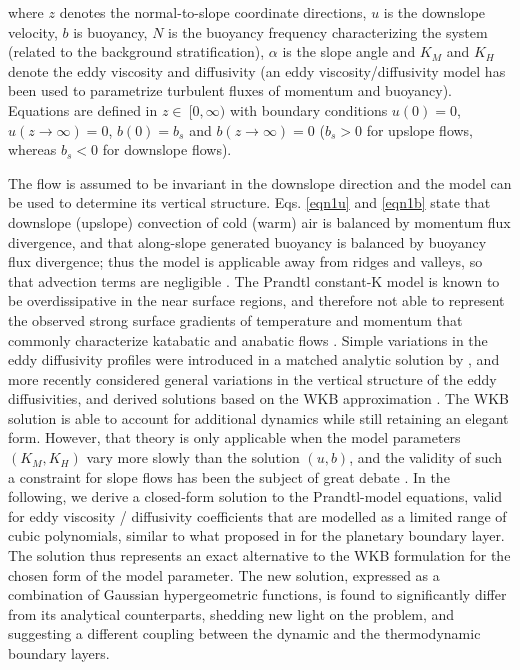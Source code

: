 %
where $z$ denotes the normal-to-slope coordinate directions, $u$ is the downslope velocity, $b$ is buoyancy, $N$ is the buoyancy frequency characterizing the system (related to the background stratification), $\alpha$ is the slope angle and $K_M$ and $K_H$ denote the eddy viscosity and diffusivity (an eddy viscosity/diffusivity model has been used to parametrize turbulent fluxes of momentum and buoyancy).
Equations are defined in $z \in \ [0,\infty)$ with boundary conditions $u(0)=0$, $u(z \rightarrow \infty) = 0$, $b(0)=b_s$ and $b(z \rightarrow \infty) = 0$ ($b_s > 0$ for upslope flows, whereas $b_s<0$ for downslope flows). 

The flow is assumed to be invariant in the downslope direction and the model can be used to determine its vertical structure.
Eqs. \ref{eqn1u} and \ref{eqn1b} state that downslope (upslope) convection of cold (warm) air is balanced by momentum flux divergence, and that along-slope generated buoyancy is balanced by buoyancy flux divergence; thus the model is applicable away from ridges and valleys, so that advection terms are negligible \citep{NAPPO1987}.
The Prandtl constant-K model is known to be overdissipative in the near surface regions, and therefore not able to represent the observed strong surface gradients of temperature and momentum that commonly characterize katabatic and anabatic flows \citep{Oerlemans1998, grisogono2001katabatic}. 
Simple variations in the eddy diffusivity profiles were introduced in a matched analytic solution by \citet{gutman_1983}, and more recently \citet{grisogono2001katabatic} considered general variations in the vertical structure of the eddy diffusivities, and derived  solutions based on the WKB approximation \citep{Bender1999}.
The WKB solution is able to account for additional dynamics while still retaining an elegant form.
However, that theory is only applicable when the model parameters $(K_M, K_H)$ vary more slowly than the solution $(u,b)$, and the validity of such a constraint for slope flows has been the subject of great debate \citep{Grisogono2002}.
In the following, we derive a closed-form solution to the Prandtl-model equations, valid for eddy viscosity / diffusivity coefficients that are modelled as a limited range of cubic polynomials, similar to what proposed in \citet{O'Brien1970} for the planetary boundary layer. 
The solution thus represents an exact alternative to the WKB formulation for the chosen form of the model parameter.
The new solution, expressed as a combination of Gaussian hypergeometric functions, is found to significantly differ from its analytical counterparts, shedding new light on the problem, and suggesting a different coupling between the dynamic and the thermodynamic boundary layers. 


